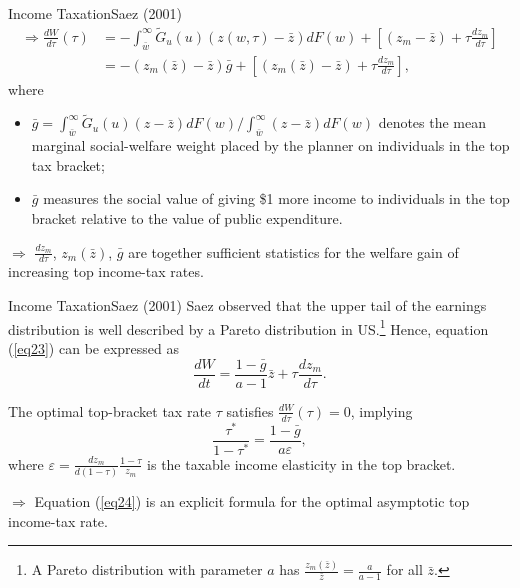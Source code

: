 \documentclass{beamer}
\begin{document}
\begin{frame}{Income Taxation}{Saez (2001)}
	\begin{equation}
		\begin{aligned}\label{eq23}
			\Rightarrow \frac{dW}{d\tau}(\tau) &= -\int_{\bar{w}}^\infty\tilde{G}_u(u)(z(w,\tau)-\bar{z})dF(w) + \left[(z_m-\bar{z})+\tau\frac{dz_m}{d\tau}\right] \\
			&= -(z_m(\bar{z})-\bar{z})\bar{g} + \left[(z_m(\bar{z})-\bar{z})+\tau\frac{dz_m}{d\tau}\right],
		\end{aligned}
	\end{equation}
	where
	\begin{itemize}
		\item $\bar{g}=\int_{\bar{w}}^\infty \tilde{G}_u(u)(z-\bar{z})dF(w)/\int_{\bar{w}}^\infty (z-\bar{z})dF(w)$ denotes the mean marginal social-welfare weight placed by the planner on individuals in the top tax bracket;
		\item $\bar{g}$ measures the social value of giving \$1 more income to individuals in the top bracket relative to the value of public expenditure.
	\end{itemize}
	\medskip

	$\Rightarrow$ $\frac{dz_m}{d\tau}$, $z_m(\bar{z})$, $\bar{g}$ are together sufficient statistics for the welfare gain of increasing top income-tax rates.
\end{frame}
\begin{frame}{Income Taxation}{Saez (2001)}
	Saez observed that the upper tail of the earnings distribution is well described by a Pareto distribution in US.\footnote{A Pareto distribution with parameter $a$ has $\frac{z_m(\bar{z})}{\bar{z}}=\frac{a}{a-1}$ for all $\bar{z}$.} Hence, equation (\ref{eq23}) can be expressed as
	\begin{equation}
		\frac{dW}{dt} = \frac{1-\bar{g}}{a-1}\bar{z} + \tau\frac{dz_m}{d\tau}.
	\end{equation}

	The optimal top-bracket tax rate $\tau$ satisfies $\frac{dW}{d\tau}(\tau)=0$, implying
	\begin{equation}\label{eq24}
		\frac{\tau^*}{1-\tau^*} = \frac{1-\bar{g}}{a\varepsilon},
	\end{equation}
	where $\varepsilon=\frac{dz_m}{d(1-\tau)}\frac{1-\tau}{z_m}$ is the taxable income elasticity in the top bracket.
	\medskip

	$\Rightarrow$ Equation (\ref{eq24}) is an explicit formula for the optimal asymptotic top income-tax rate.
\end{frame}
\end{document}
